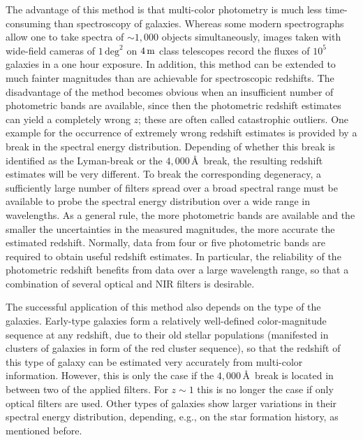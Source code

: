 \documentclass[a4paper,11pt]{article}
\begin{document}
{\noindent}The advantage of this method is that multi-color photometry is much less time-consuming than spectroscopy of galaxies. Whereas some modern spectrographs allow one to take spectra of $\sim1,000$ objects simultaneously, images taken with wide-field cameras of $1\,\mathrm{deg}^2$ on $4\,{\rm m}$ class telescopes record the fluxes of $10^5$ galaxies in a one hour exposure. In addition, this method can be extended to much fainter magnitudes than are achievable for spectroscopic redshifts. The disadvantage of the method becomes obvious when an insufficient number of photometric bands are available, since then the photometric redshift estimates can yield a completely wrong $z$; these are often called catastrophic outliers. One example for the occurrence of extremely wrong redshift estimates is provided by a break in the spectral energy distribution. Depending of whether this break is identified as the Lyman-break or the $4,000$\,\AA~break, the resulting redshift estimates will be very different. To break the corresponding degeneracy, a sufficiently large number of filters spread over a broad spectral range must be available to probe the spectral energy distribution over a wide range in wavelengths. As a general rule, the more photometric bands are available and the smaller the uncertainties in the measured magnitudes, the more accurate the estimated redshift. Normally, data from four or five photometric bands are required to obtain useful redshift estimates. In particular, the reliability of the photometric redshift benefits from data over a large wavelength range, so that a combination of several optical and NIR filters is desirable.

{\noindent}The successful application of this method also depends on the type of the galaxies. Early-type galaxies form a relatively well-defined color-magnitude sequence at any redshift, due to their old stellar populations (manifested in clusters of galaxies in form of the red cluster sequence), so that the redshift of this type of galaxy can be estimated very accurately from multi-color information. However, this is only the case if the $4,000$\,\AA~break is located in between two of the applied filters. For $z\sim1$ this is no longer the case if only optical filters are used. Other types of galaxies show larger variations in their spectral energy distribution, depending, e.g., on the star formation history, as mentioned before.
\end{document}
